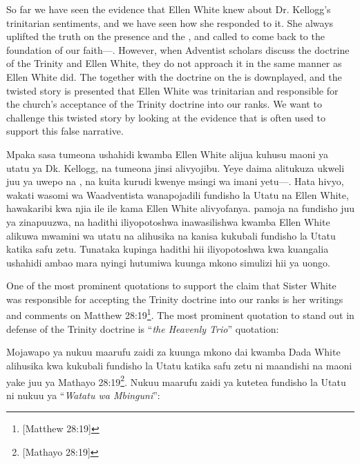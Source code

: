 



So far we have seen the evidence that Ellen White knew about Dr. Kellogg's trinitarian sentiments, and we have seen how she responded to it. She always uplifted the truth on the presence and the , and called to come back to the foundation of our faith—. However, when Adventist scholars discuss the doctrine of the Trinity and Ellen White, they do not approach it in the same manner as Ellen White did. The  together with the doctrine on the  is downplayed, and the twisted story is presented that Ellen White was trinitarian and responsible for the church's acceptance of the Trinity doctrine into our ranks. We want to challenge this twisted story by looking at the evidence that is often used to support this false narrative.


Mpaka sasa tumeona ushahidi kwamba Ellen White alijua kuhusu maoni ya utatu ya Dk. Kellogg, na tumeona jinsi alivyojibu. Yeye daima alitukuza ukweli juu ya uwepo na , na kuita kurudi kwenye msingi wa imani yetu—. Hata hivyo, wakati wasomi wa Waadventista wanapojadili fundisho la Utatu na Ellen White, hawakaribi kwa njia ile ile kama Ellen White alivyofanya.  pamoja na fundisho juu ya  zinapuuzwa, na hadithi iliyopotoshwa inawasilishwa kwamba Ellen White alikuwa mwamini wa utatu na alihusika na kanisa kukubali fundisho la Utatu katika safu zetu. Tunataka kupinga hadithi hii iliyopotoshwa kwa kuangalia ushahidi ambao mara nyingi hutumiwa kuunga mkono simulizi hii ya uongo.


One of the most prominent quotations to support the claim that Sister White was responsible for accepting the Trinity doctrine into our ranks is her writings and comments on Matthew 28:19\footnote{[Matthew 28:19]}. The most prominent quotation to stand out in defense of the Trinity doctrine is “\textit{the Heavenly Trio}” quotation:


Mojawapo ya nukuu maarufu zaidi za kuunga mkono dai kwamba Dada White alihusika kwa kukubali fundisho la Utatu katika safu zetu ni maandishi na maoni yake juu ya Mathayo 28:19\footnote{[Mathayo 28:19]}. Nukuu maarufu zaidi ya kutetea fundisho la Utatu ni nukuu ya “\textit{Watatu wa Mbinguni}”:


